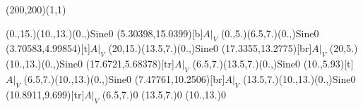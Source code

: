 \unitlength=1bp%

\begin{feynartspicture}(200,200)(1,1)

\FADiagram{}
\FAProp(0.,15.)(10.,13.)(0.,){Sine}{0}
\FALabel(5.30398,15.0399)[b]{$A|_V$}
\FAProp(0.,5.)(6.5,7.)(0.,){Sine}{0}
\FALabel(3.70583,4.99854)[t]{$A|_V$}
\FAProp(20,15.)(13.5,7.)(0.,){Sine}{0}
\FALabel(17.3355,13.2775)[br]{$A|_V$}
\FAProp(20,5.)(10.,13.)(0.,){Sine}{0}
\FALabel(17.6721,5.68378)[tr]{$A|_V$}
\FAProp(6.5,7.)(13.5,7.)(0.,){Sine}{0}
\FALabel(10.,5.93)[t]{$A|_V$}
\FAProp(6.5,7.)(10.,13.)(0.,){Sine}{0}
\FALabel(7.47761,10.2506)[br]{$A|_V$}
\FAProp(13.5,7.)(10.,13.)(0.,){Sine}{0}
\FALabel(10.8911,9.699)[tr]{$A|_V$}
\FAVert(6.5,7.){0}
\FAVert(13.5,7.){0}
\FAVert(10.,13.){0}
\end{feynartspicture}

